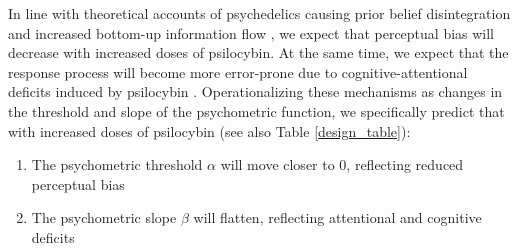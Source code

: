 \documentclass{article}
\begin{document}
In line with theoretical accounts of psychedelics causing prior belief disintegration and increased bottom-up information flow \parencite{Carhart-Harris2019-dq, Vollenweider2020-oq}, we expect that perceptual bias will decrease with increased doses of psilocybin. At the same time, we expect that the response process %
will become more error-prone due to cognitive-attentional deficits induced by psilocybin \parencite{carter2005att-wm-1a2a, quednow2012inhibition-deficits, barrett2018psidxm}.
Operationalizing these mechanisms as changes in the threshold and slope of the psychometric function, we specifically predict that with increased doses of psilocybin (see also Table \ref{design_table}):
\begin{enumerate}
  \item The psychometric threshold $\alpha$ will move closer to 0, reflecting reduced perceptual bias
  \item The psychometric slope $\beta$ will flatten, reflecting attentional and cognitive deficits
\end{enumerate}
\end{document}
